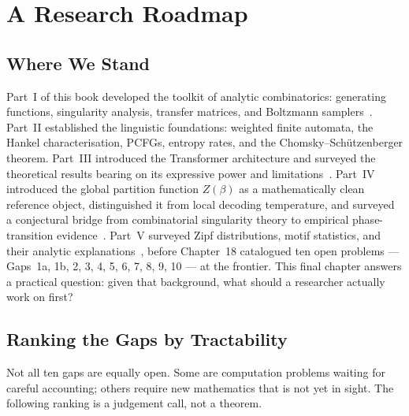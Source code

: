 \chapter{A Research Roadmap}
\label{ch19:top}
\label{ch19}

\section{Where We Stand}
\label{ch19:wherewestand}

Part~I of this book developed the toolkit of analytic combinatorics:
generating functions, singularity analysis, transfer matrices, and
Boltzmann samplers~\cite{FlajoletSedgewick2009}.  Part~II established
the linguistic foundations: weighted finite automata, the Hankel
characterisation, PCFGs, entropy rates, and the Chomsky--Schützenberger
theorem.  Part~III introduced the Transformer architecture and surveyed
the theoretical results bearing on its expressive power and
limitations~\cite{WeissGoldbergYahav2018,MerrillSabharwalSmith2022,RizviEtAl2024}.
Part~IV introduced the global partition function $Z(\beta)$ as a mathematically clean reference object, distinguished it from local decoding temperature, and surveyed a conjectural bridge from combinatorial singularity theory to empirical phase-transition evidence~\cite{BanderierKubaWallner2021}.  Part~V
surveyed Zipf distributions, motif statistics, and their analytic
explanations~\cite{Szpankowski2001}, before Chapter~18 catalogued ten
open problems --- Gaps~1a, 1b, 2, 3, 4, 5, 6, 7, 8, 9, 10 --- at the
frontier.  This final chapter answers a practical question: given that
background, what should a researcher actually work on first?

\section{Ranking the Gaps by Tractability}
\label{ch19:ranking}

Not all ten gaps are equally open.  Some are computation problems
waiting for careful accounting; others require new mathematics that is
not yet in sight.  The following ranking is a judgement call, not a
theorem.

